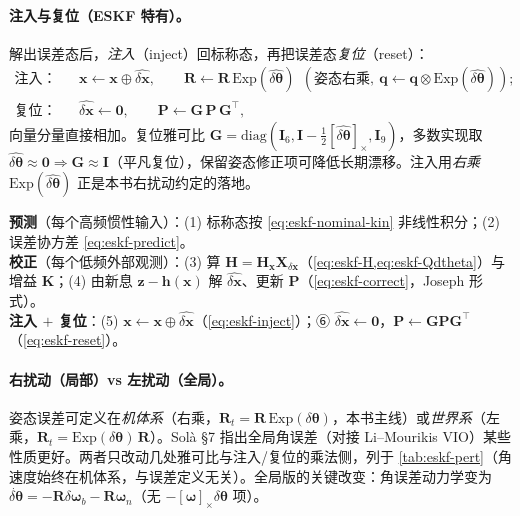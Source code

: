 \paragraph{注入与复位（ESKF 特有）。}
解出误差态后，\emph{注入}（inject）回标称态，再把误差态\emph{复位}（reset）：
\begin{align}
  \text{注入：}\quad
  &\mathbf{x}\leftarrow\mathbf{x}\oplus\widehat{\delta\mathbf{x}},\qquad
  \mathbf{R}\leftarrow\mathbf{R}\,\mathrm{Exp}(\widehat{\delta\boldsymbol{\theta}})\ \ (\text{姿态右乘},\ \mathbf{q}\leftarrow\mathbf{q}\otimes\mathrm{Exp}(\widehat{\delta\boldsymbol{\theta}})); \label{eq:eskf-inject}\\
  \text{复位：}\quad
  &\widehat{\delta\mathbf{x}}\leftarrow\mathbf{0},\qquad
  \mathbf{P}\leftarrow\mathbf{G}\,\mathbf{P}\,\mathbf{G}^\top, \label{eq:eskf-reset}
\end{align}
向量分量直接相加。复位雅可比 $\mathbf{G}=\mathrm{diag}(\mathbf{I}_6,\mathbf{I}-\tfrac12[\widehat{\delta\boldsymbol{\theta}}]_\times,\mathbf{I}_9)$，多数实现取 $\widehat{\delta\boldsymbol{\theta}}\approx\mathbf{0}\Rightarrow\mathbf{G}\approx\mathbf{I}$（平凡复位），保留姿态修正项可降低长期漂移\cite{sola2017quaternion}。注入用\emph{右乘} $\mathrm{Exp}(\widehat{\delta\boldsymbol{\theta}})$ 正是本书右扰动约定的落地。

\begin{algo}\label{algo:eskf}
\textbf{预测}（每个高频惯性输入）：(1) 标称态按 \cref{eq:eskf-nominal-kin} 非线性积分；(2) 误差协方差 \cref{eq:eskf-predict}。\\
\textbf{校正}（每个低频外部观测）：(3) 算 $\mathbf{H}=\mathbf{H}_{\mathbf{x}}\mathbf{X}_{\delta\mathbf{x}}$（\cref{eq:eskf-H,eq:eskf-Qdtheta}）与增益 $\mathbf{K}$；(4) 由新息 $\mathbf{z}-\mathbf{h}(\mathbf{x})$ 解 $\widehat{\delta\mathbf{x}}$、更新 $\mathbf{P}$（\cref{eq:eskf-correct}，Joseph 形式）。\\
\textbf{注入 $+$ 复位}：(5) $\mathbf{x}\leftarrow\mathbf{x}\oplus\widehat{\delta\mathbf{x}}$（\cref{eq:eskf-inject}）；⑥ $\widehat{\delta\mathbf{x}}\leftarrow\mathbf{0}$，$\mathbf{P}\leftarrow\mathbf{G}\mathbf{P}\mathbf{G}^\top$（\cref{eq:eskf-reset}）。
\end{algo}

\paragraph{右扰动（局部）vs 左扰动（全局）。}
姿态误差可定义在\emph{机体系}（右乘，$\mathbf{R}_t=\mathbf{R}\,\mathrm{Exp}(\delta\boldsymbol{\theta})$，本书主线）或\emph{世界系}（左乘，$\mathbf{R}_t=\mathrm{Exp}(\delta\boldsymbol{\theta})\,\mathbf{R}$）。Solà\cite{sola2017quaternion} §7 指出全局角误差（对接 Li–Mourikis VIO）某些性质更好。两者只改动几处雅可比与注入/复位的乘法侧，列于 \cref{tab:eskf-pert}（角速度始终在机体系，与误差定义无关）。全局版的关键改变：角误差动力学变为 $\dot{\delta\boldsymbol{\theta}}=-\mathbf{R}\delta\boldsymbol{\omega}_b-\mathbf{R}\boldsymbol{\omega}_n$（无 $-[\boldsymbol{\omega}]_\times\delta\boldsymbol{\theta}$ 项）。

